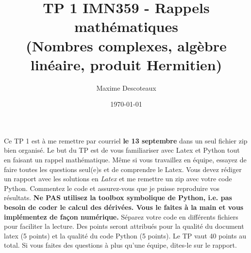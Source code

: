 \documentclass{article}
\title{TP 1 IMN359 - Rappels mathématiques \\
(Nombres complexes, algèbre linéaire, produit Hermitien)}
\author{Maxime Descoteaux}
\date{\today}
\begin{document}
\maketitle

Ce TP 1 est à me remettre par courriel {\bf le 13 septembre} 
dans un seul fichier zip bien organisé. Le but du TP est de vous
familiariser avec Latex et Python tout en faisant un rappel
mathématique. Même si vous travaillez en équipe, essayez de faire
toutes les questions seul(e)s et de comprendre le Latex. 
Vous devez rédiger un rapport avec les solutions en 
\emph{Latex} et me remettre un zip avec votre code Python. Commentez
le code et assurez-vous que je puisse reproduire vos 
résultats. {\bf Ne PAS utilisez la toolbox symbolique de Python,
  i.e. pas besoin de coder le calcul des dérivées. Vous le faites à la
main et vous implémentez de façon numérique.}
Séparez votre code en différents fichiers pour faciliter la
lecture. Des points seront attribués pour la qualité du document latex
(5 points) et la qualité du code Python (5 points). Le TP vaut 40
points au total. Si vous faites des questions à plus qu'une équipe,
dites-le sur le rapport. 
\end{document}
